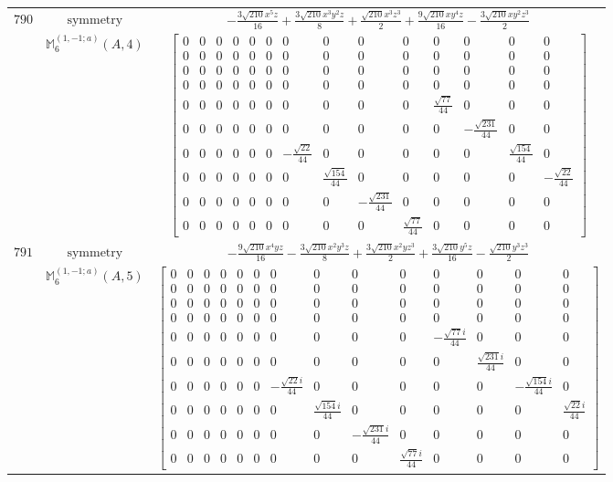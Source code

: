 \documentclass[fleqn,8pt,landscape]{jsarticle}
\begin{document}
\begin{longtable}{ccc}
$ 790 $ & $ \text{symmetry} $ & $ - \frac{3 \sqrt{210} x^{5} z}{16} + \frac{3 \sqrt{210} x^{3} y^{2} z}{8} + \frac{\sqrt{210} x^{3} z^{3}}{2} + \frac{9 \sqrt{210} x y^{4} z}{16} - \frac{3 \sqrt{210} x y^{2} z^{3}}{2} $ \\
$  $ & $ \mathbb{M}_{6}^{(1,-1;a)}(A,4) $ & $ \begin{bmatrix} 0 & 0 & 0 & 0 & 0 & 0 & 0 & 0 & 0 & 0 & 0 & 0 & 0 & 0 \\ 0 & 0 & 0 & 0 & 0 & 0 & 0 & 0 & 0 & 0 & 0 & 0 & 0 & 0 \\ 0 & 0 & 0 & 0 & 0 & 0 & 0 & 0 & 0 & 0 & 0 & 0 & 0 & 0 \\ 0 & 0 & 0 & 0 & 0 & 0 & 0 & 0 & 0 & 0 & 0 & 0 & 0 & 0 \\ 0 & 0 & 0 & 0 & 0 & 0 & 0 & 0 & 0 & 0 & \frac{\sqrt{77}}{44} & 0 & 0 & 0 \\ 0 & 0 & 0 & 0 & 0 & 0 & 0 & 0 & 0 & 0 & 0 & - \frac{\sqrt{231}}{44} & 0 & 0 \\ 0 & 0 & 0 & 0 & 0 & 0 & - \frac{\sqrt{22}}{44} & 0 & 0 & 0 & 0 & 0 & \frac{\sqrt{154}}{44} & 0 \\ 0 & 0 & 0 & 0 & 0 & 0 & 0 & \frac{\sqrt{154}}{44} & 0 & 0 & 0 & 0 & 0 & - \frac{\sqrt{22}}{44} \\ 0 & 0 & 0 & 0 & 0 & 0 & 0 & 0 & - \frac{\sqrt{231}}{44} & 0 & 0 & 0 & 0 & 0 \\ 0 & 0 & 0 & 0 & 0 & 0 & 0 & 0 & 0 & \frac{\sqrt{77}}{44} & 0 & 0 & 0 & 0 \end{bmatrix} $ \\ \hline
$ 791 $ & $ \text{symmetry} $ & $ - \frac{9 \sqrt{210} x^{4} y z}{16} - \frac{3 \sqrt{210} x^{2} y^{3} z}{8} + \frac{3 \sqrt{210} x^{2} y z^{3}}{2} + \frac{3 \sqrt{210} y^{5} z}{16} - \frac{\sqrt{210} y^{3} z^{3}}{2} $ \\
$  $ & $ \mathbb{M}_{6}^{(1,-1;a)}(A,5) $ & $ \begin{bmatrix} 0 & 0 & 0 & 0 & 0 & 0 & 0 & 0 & 0 & 0 & 0 & 0 & 0 & 0 \\ 0 & 0 & 0 & 0 & 0 & 0 & 0 & 0 & 0 & 0 & 0 & 0 & 0 & 0 \\ 0 & 0 & 0 & 0 & 0 & 0 & 0 & 0 & 0 & 0 & 0 & 0 & 0 & 0 \\ 0 & 0 & 0 & 0 & 0 & 0 & 0 & 0 & 0 & 0 & 0 & 0 & 0 & 0 \\ 0 & 0 & 0 & 0 & 0 & 0 & 0 & 0 & 0 & 0 & - \frac{\sqrt{77} i}{44} & 0 & 0 & 0 \\ 0 & 0 & 0 & 0 & 0 & 0 & 0 & 0 & 0 & 0 & 0 & \frac{\sqrt{231} i}{44} & 0 & 0 \\ 0 & 0 & 0 & 0 & 0 & 0 & - \frac{\sqrt{22} i}{44} & 0 & 0 & 0 & 0 & 0 & - \frac{\sqrt{154} i}{44} & 0 \\ 0 & 0 & 0 & 0 & 0 & 0 & 0 & \frac{\sqrt{154} i}{44} & 0 & 0 & 0 & 0 & 0 & \frac{\sqrt{22} i}{44} \\ 0 & 0 & 0 & 0 & 0 & 0 & 0 & 0 & - \frac{\sqrt{231} i}{44} & 0 & 0 & 0 & 0 & 0 \\ 0 & 0 & 0 & 0 & 0 & 0 & 0 & 0 & 0 & \frac{\sqrt{77} i}{44} & 0 & 0 & 0 & 0 \end{bmatrix} $ \\ \hline

\end{longtable}
\end{document}
